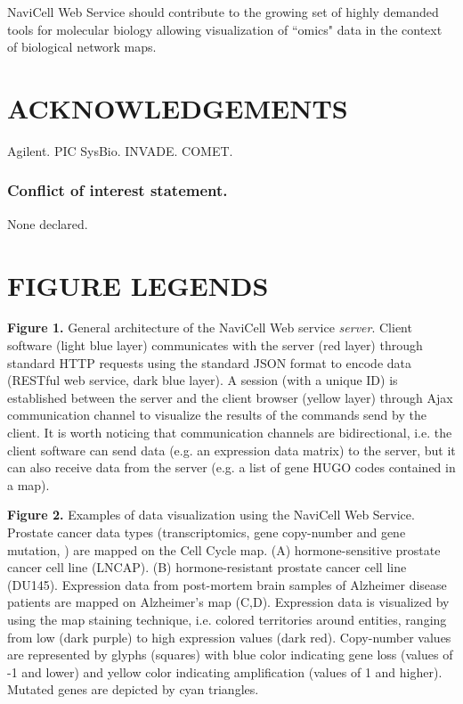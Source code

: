 \documentclass[a4,center,fleqn]{NAR}
\begin{document}
NaviCell Web Service should contribute to the growing set of highly demanded
tools for molecular biology allowing visualization of ``omics" data in the
context of biological network maps.

\section{ACKNOWLEDGEMENTS}

Agilent. PIC SysBio. INVADE. COMET.

\subsubsection{Conflict of interest statement.} None declared.
\newpage



\section{FIGURE LEGENDS}

\textbf{Figure 1.} General architecture of the NaviCell Web service
\emph{server}. Client software (light blue layer) communicates with the server
(red layer) through standard HTTP requests using the standard JSON format to
encode data (RESTful web service, dark blue layer). A session (with a unique ID)
is established between the server and the client browser (yellow layer) through
Ajax communication channel to visualize the results of the commands send by the
client. It is worth noticing that communication channels are bidirectional, i.e.
the client software can send data (e.g. an expression data matrix) to the
server, but it can also receive data from the server (e.g. a list of gene HUGO
codes contained in a map).

\textbf{Figure 2.} Examples of data visualization using the NaviCell Web
Service. Prostate cancer data types (transcriptomics, gene copy-number and gene
mutation, \cite{barretina2012cancer}) are mapped on the Cell Cycle map. (A) hormone-sensitive prostate
cancer cell line (LNCAP). (B) hormone-resistant prostate cancer cell line
(DU145). Expression data from post-mortem brain samples of Alzheimer disease
patients \cite{Hokama2014} are mapped on Alzheimer's map (C,D). Expression data is visualized by
using the map staining technique, i.e. colored territories around entities,
ranging from low  (dark purple) to high expression values (dark red).
Copy-number values are represented by glyphs (squares) with blue color
indicating gene loss (values of -1 and lower) and yellow color indicating
amplification (values of 1 and higher). Mutated genes are depicted by cyan
triangles.
\end{document}
